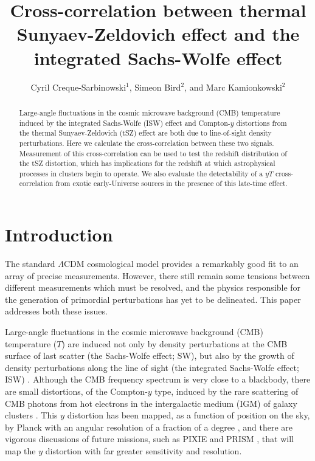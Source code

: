 \documentclass[aps,twocolumn,floats,prd,nofootinbib,10pt,floatfix]{revtex4-1}
\begin{document}
\title{Cross-correlation between thermal Sunyaev-Zeldovich
     effect and the integrated Sachs-Wolfe effect}
\author{Cyril Creque-Sarbinowski$^1$, Simeon Bird$^2$, and Marc
     Kamionkowski$^2$} 

\begin{abstract}
Large-angle fluctuations in the cosmic microwave background
(CMB) temperature induced by the integrated Sachs-Wolfe (ISW)
effect and Compton-$y$ distortions from the thermal
Sunyaev-Zeldovich (tSZ) effect are both due to line-of-sight
density perturbations.  Here we calculate the cross-correlation
between these two signals.  Measurement of this
cross-correlation can be used to test the redshift distribution
of the tSZ distortion, which has implications for the redshift at which 
astrophysical processes in clusters begin to operate.  We also evaluate 
the detectability of a $yT$ cross-correlation from exotic early-Universe 
sources in the presence of this late-time effect.
\end{abstract}


\maketitle
\section{Introduction}
\label{sec:intro}

The standard $\Lambda$CDM cosmological model provides a
remarkably good fit to an array of precise measurements.
However, there still remain some tensions between different
measurements which must be resolved, and the physics responsible
for the generation of primordial perturbations has yet to be
delineated.  This paper addresses both these issues.

Large-angle fluctuations in the cosmic microwave background
(CMB) temperature ($T$) are induced not only by density perturbations
at the CMB surface of last scatter (the Sachs-Wolfe effect; SW), but
also by the growth of density perturbations along the line of
sight (the integrated Sachs-Wolfe effect; ISW)
\cite{Sachs:1967er}.  Although the
CMB frequency spectrum is very close to a blackbody, there are
small distortions, of the Compton-$y$ type, induced by the rare
scattering of CMB photons from hot
electrons in the intergalactic medium (IGM) of galaxy clusters
\cite{Sunyaev:1972eq}.  This $y$ distortion has been mapped, as
a function of position on the sky, by Planck with an angular
resolution of a fraction of a degree
\cite{Ade:2013qta,Aghanim:2015eva}, and there are vigorous
discussions of future missions, such as PIXIE \cite{Kogut:2011xw}
and PRISM \cite{Andre:2013nfa}, that will map the $y$ distortion
with far greater sensitivity and resolution.
\end{document}
